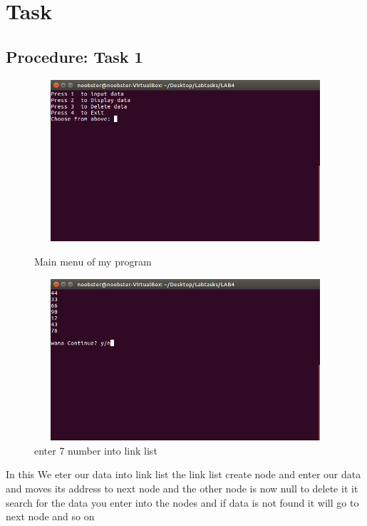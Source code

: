 \documentclass[11pt]{article}            %
\begin{document}
\section{Task}  
\subsection{Procedure: Task 1 }     

\begin{figure}
\centering
  \includegraphics[width=12cm,height=6cm,keepaspectratio]{1.png}
\caption{Main menu of my program}
\label{Figure:1}    
  \includegraphics[width=12cm,height=6cm,keepaspectratio]{2.png}
\caption{enter 7 number  into link list}
\label{Figure:2}   
\end{figure}
In this We eter our data into link list the link list create node and enter our data and moves its address to next node and the other node is now null to delete it it search for the data you enter into the nodes and if data is not found it will go to next node and so on\ 
\end{document}
